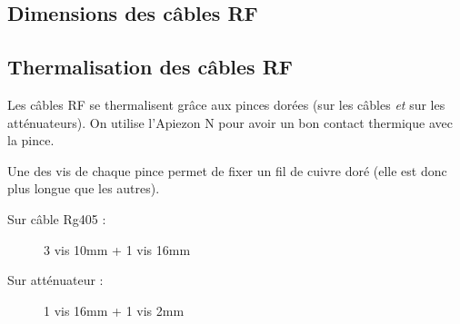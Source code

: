 \documentclass[a4paper,11pt]{article}
\begin{document}
\subsection{Dimensions des câbles RF}

\subsection{Thermalisation des câbles RF}

Les câbles RF se thermalisent grâce aux pinces dorées (sur les câbles \textit{et} sur les atténuateurs). On utilise l'Apiezon N pour avoir un bon contact thermique avec la pince.

Une des vis de chaque pince permet de fixer un fil de cuivre doré (elle est donc plus longue que les autres).

\begin{description}
    \item[Sur câble Rg405 :] 3 vis 10mm + 1 vis 16mm
    \item[Sur atténuateur :] 1 vis 16mm + 1 vis 2mm
\end{description}
\end{document}
